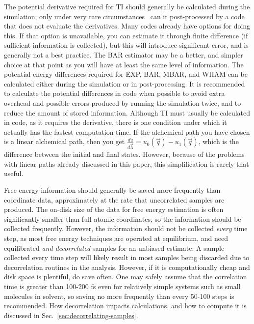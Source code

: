 \documentclass[9pt,bestpractices]{livecoms}
\begin{document}
The potential derivative required for TI should generally be calculated during the simulation; only under very rare circumstances~\cite{naden2015linear} can it post-processed by a code that does not evaluate the derivatives. Many codes already have options for doing this.
If that option is unavailable, you can estimate it through finite difference (if sufficient information is collected), but this will introduce significant error, and is generally not a best practice. The BAR estimator may be a better, and simpler choice at that point as you will have at least the same level of information. 
The potential energy differences required for EXP, BAR, MBAR, and WHAM can be calculated either during the simulation or in post-processing. It is recommended to calculate the potential differences in code when possible to avoid extra overhead and possible errors produced by running the simulation twice, and to reduce the amount of stored information. 
Although TI must usually be calculated in code, as it requires the derivative, there is one condition under which it actually has the fastest computation time. 
If the alchemical path you have chosen is a linear alchemical path, then you get $\frac{du}{d\vec{\lambda}} = u_0(\vec{q}) - u_1(\vec{q})$, which is the difference between the initial and final states. 
However, because of the problems with linear paths already discussed in this paper, this simplification is rarely that useful.


Free energy information should generally be saved more frequently than coordinate data, approximately at the rate that uncorrelated samples are produced.  
The on-disk size of the data for free energy estimation is often significantly smaller than full atomic coordinates, so the information should be collected frequently. 
However, the information should not be collected \textit{every} time step, as most free energy techniques are operated at equilibrium, and need equilibrated \textit{and decorrelated} samples for an unbiased estimate.
A sample collected every time step will likely result in most samples being discarded due to decorrelation routines in the analysis. However, if it is computationally cheap and disk space is plentiful, do save often. One may safely assume that the correlation time is greater than 100-200 fs even for relatively simple systems such as small molecules in solvent, so saving no more frequently than every 50-100 steps is recommended. 
How decorrelation impacts calculations, and how to compute it is discussed in Sec.~\ref{sec:decorrelating-samples}. 
\end{document}
